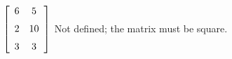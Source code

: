 {$\left[ \begin {array}{cc} 6&5\\\noalign{\medskip}2&10
\\\noalign{\medskip}3&3\end {array} \right]$} 
{Not defined; the matrix must be square.}



  

